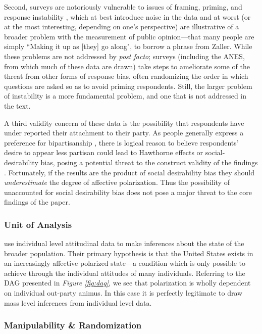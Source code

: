 \documentclass[12pt]{article}
\begin{document}
Second, surveys are notoriously vulnerable to issues of framing, priming, and response instability \citep[p. 53--75]{zaller1992nature}, which at best introduce noise in the data and at worst (or at the most interesting, depending on one's perspective) are illustrative of a broader problem with the measurement of public opinion---that many people are simply ``Making it up as [they] go along", to borrow a phrase from Zaller. While these problems are not addressed by \citeauthor{iyengar2012affect} \textit{post facto}; surveys (including the ANES, from which much of these data are drawn) take steps to ameliorate some of the threat from other forms of response bias, often randomizing the order in which questions are asked so as to avoid priming respondents. Still, the larger problem of instability is a more fundamental problem, and one that is not addressed in the text.

A third validity concern of these data is the possibility that respondents have under reported their attachment to their party. As people generally express a preference for bipartisanship \citep{harbridge2014public}, there is logical reason to believe respondents' desire to appear less partisan could lead to Hawthorne effects or social-desirability bias, posing a potential threat to the construct validity of the findings \citep[p. 73, Table 3.1 Item 8]{shadish2002experimental}. Fortunately, if the results are the product of social desirability bias they should \textit{underestimate} the degree of affective polarization. Thus the possibility of unaccounted for social desirability bias does not pose a major threat to the core findings of the paper.


\subsubsection{Unit of Analysis}

\citeauthor{iyengar2012affect} use individual level attitudinal data to make inferences about the state of the broader population. Their primary hypothesis is that the United States exists in an increasingly affective polarized state---a condition which is only possible to achieve through the individual attitudes of many individuals. Referring to the DAG presented in \textit{Figure \ref{fig:dag}}, we see that polarization is wholly dependent on individual out-party animus. In this case it is perfectly legitimate to draw mass level inferences from individual level data.

\subsubsection{Manipulability \& Randomization}
\end{document}
